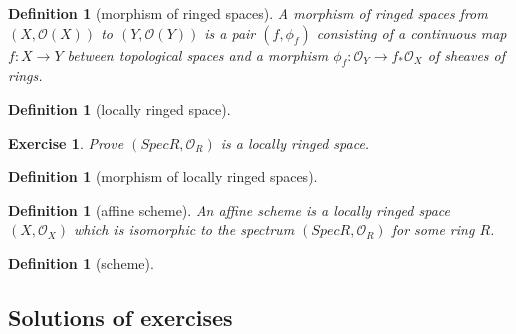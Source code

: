 \documentclass[12pt]{article}
\newtheorem{definition}[proposition]{Definition}
\newtheorem{ex}[proposition]{Exercise}
\begin{document}
\begin{definition}[morphism of ringed spaces]
	A morphism of ringed spaces from $(X, \mathscr{O}(X))$ to $(Y, \mathscr{O}(Y))$ is a pair $(f, \phi_f)$ consisting of a continuous map $f: X \rightarrow Y$ between topological spaces and a morphism $\phi_f: \mathscr{O}_Y \rightarrow f_{*} \mathscr{O}_X$ of sheaves of rings.   
\end{definition}

\begin{definition}[locally ringed space]
		
\end{definition}

\begin{ex}
	Prove $(Spec R, \mathscr{O}_R)$ is a locally ringed space.
\end{ex}	

\begin{definition}[morphism of locally ringed spaces]
	
\end{definition}	

\begin{definition}[affine scheme]
	An affine scheme is a locally ringed space $(X, \mathscr{O}_X)$ which is isomorphic to the spectrum $(Spec R, \mathscr{O}_R)$ for some ring $R$. 
\end{definition}

\begin{definition}[scheme]
	
\end{definition}	
																	

\begin{appendices}
	\addappheadtotoc

\section{Solutions of exercises}

	

	
\end{appendices}						

		
\end{document}
